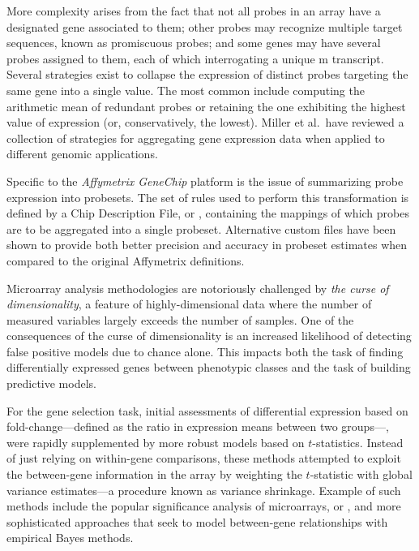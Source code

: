 More complexity arises from the fact that not all probes in an array have a
designated gene associated to them; other probes may recognize multiple target
sequences, known as promiscuous probes; and some genes may have several probes
assigned to them, each of which interrogating a unique m
transcript.  Several strategies exist to collapse the expression of distinct
probes targeting the same gene into a single value.  The most common include
computing the arithmetic mean of redundant probes or retaining the one
exhibiting the highest value of expression (or, conservatively, the lowest).
Miller et al.~have reviewed a collection of strategies for aggregating gene
expression data when applied to different genomic
applications.\cite{miller_strategies_2011}

Specific to the \emph{Affymetrix GeneChip} platform is the issue of summarizing
probe expression into probesets.  The set of rules used to perform this
transformation is defined by a Chip Description File, or ,
containing the mappings of which probes are to be aggregated into a single
probeset.  Alternative custom  files have been shown to provide
both better precision and accuracy in probeset estimates when compared to the
original Affymetrix definitions.\cite{sandberg_improved_2007}

Microarray analysis methodologies are notoriously challenged by \emph{the curse
  of dimensionality},\cite{bellman_adaptive_1961} a feature of
highly-dimensional data where the number of measured variables largely exceeds
the number of samples.  One of the consequences of the curse of dimensionality
is an increased likelihood of detecting false positive models due to chance
alone.  This impacts both the task of finding differentially expressed genes
between phenotypic classes and the task of building predictive models.

For the gene selection task, initial assessments of differential expression
based on fold-change---defined as the ratio in expression means between two
groups---, were rapidly supplemented by more robust models based on
\mbox{$t$-statistics}.  Instead of just relying on within-gene comparisons,
these methods attempted to exploit the between-gene information in the array by
weighting the $t$-statistic with global variance estimates---a procedure known
as variance shrinkage.  Example of such methods include the popular significance
analysis of microarrays, or ,\cite{tusher_significance_2001} and
more sophisticated approaches that seek to model between-gene relationships with
empirical Bayes methods.\cite{newton_differential_2001}

